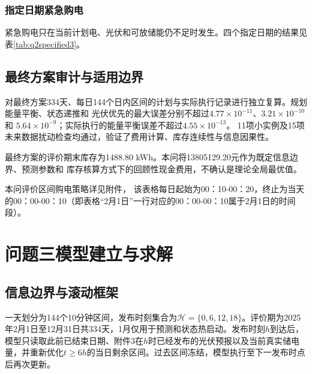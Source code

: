 \documentclass[UTF8,a4paper,12pt]{ctexart}
\begin{document}
\subsubsection{指定日期紧急购电}
紧急购电只在当前计划电、光伏和可放储能仍不足时发生。四个指定日期的结果见
表\ref{tab:q2specified3}。

\begin{table}[H]
  \centering\small
  \setlength{\tabcolsep}{3.5pt}
  \renewcommand{\arraystretch}{0.94}
  \caption{微网在指定日期的紧急购电量}\label{tab:q2specified3}
\end{table}

\subsection{最终方案审计与适用边界}
对最终方案334天、每日144个日内区间的计划与实际执行记录进行独立复算。规划能量平衡、状态递推和
光伏优先的最大误差分别不超过$4.77\times10^{-11}$、$3.21\times10^{-10}$和
$5.64\times10^{-9}$；实际执行的能量平衡误差不超过$4.55\times10^{-13}$。
11项小实例及15项未来数据扰动检查均通过，验证了费用计算、库存连续性与信息因果性。

最终方案的评价期末库存为1488.80 kWh。本问将13805129.20元作为既定信息边界、预测参数和
库存核算方式下的回顾性现金费用，不确认是理论全局最优值。

本问评价区间购电策略详见附件，
该表格每日起始为00：10-00：20，终止为当天的00：00-00：10（即表格“2月1日”一行对应的00：00-00：10属于2月1日的时间段）。
\section{问题三模型建立与求解}

\subsection{信息边界与滚动框架}
一天划分为144个10分钟区间，发布时刻集合为$\mathcal H=\{0,6,12,18\}$。评价期为2025年2月1日至12月31日共334天，1月仅用于预测和状态热启动。发布时刻$h$到达后，模型只读取此前已结束日期、附件3在$h$时已经发布的光伏预报以及当前真实储电量，并重新优化$t\ge 6h$的当日剩余区间。过去区间冻结，模型执行至下一发布时点后再次更新。
\end{document}
